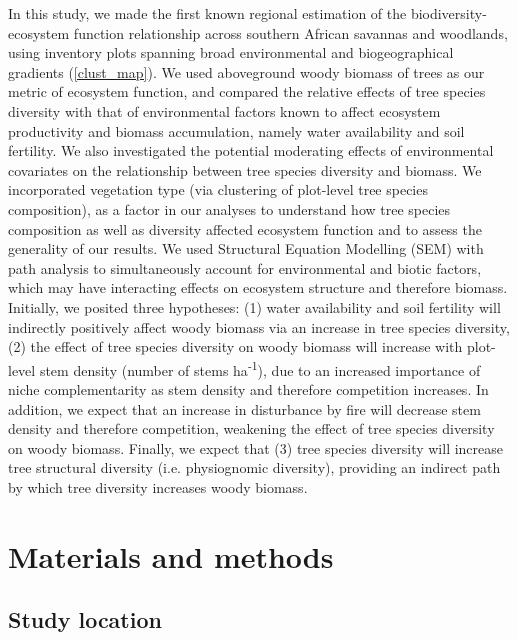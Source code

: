 \documentclass[11pt,a4paper]{article}
\begin{document}
In this study, we made the first known regional estimation of the biodiversity-ecosystem function relationship across southern African savannas and woodlands, using inventory plots spanning broad environmental and biogeographical gradients (\autoref{clust_map}). We used aboveground woody biomass of trees as our metric of ecosystem function, and compared the relative effects of tree species diversity with that of environmental factors known to affect ecosystem productivity and biomass accumulation, namely water availability and soil fertility. We also investigated the potential moderating effects of environmental covariates on the relationship between tree species diversity and biomass. We incorporated vegetation type (via clustering of plot-level tree species composition), as a factor in our analyses to understand how tree species composition as well as diversity affected ecosystem function and to assess the generality of our results. We used Structural Equation Modelling (SEM) with path analysis to simultaneously account for environmental and biotic factors, which may have interacting effects on ecosystem structure and therefore biomass. Initially, we posited three hypotheses: (1) water availability and soil fertility will indirectly positively affect woody biomass via an increase in tree species diversity, (2) the effect of tree species diversity on woody biomass will increase with plot-level stem density (number of stems ha\textsuperscript{-1}), due to an increased importance of niche complementarity as stem density and therefore competition increases. In addition, we expect that an increase in disturbance by fire will decrease stem density and therefore competition, weakening the effect of tree species diversity on woody biomass. Finally, we expect that (3) tree species diversity will increase tree structural diversity (i.e. physiognomic diversity), providing an indirect path by which tree diversity increases woody biomass.

\section{Materials and methods}

\subsection{Study location}
\end{document}
